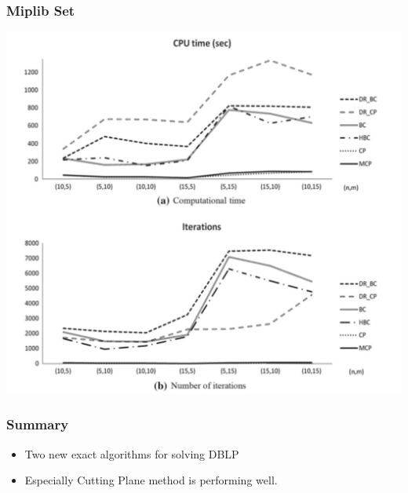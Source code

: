 \documentclass[11pt]{beamer}
\begin{document}
\begin{frame}
	\frametitle{Miplib Set}
\centering
\includegraphics[height=0.8\textheight]{run-times.pdf}
\end{frame}

\begin{frame}
	\frametitle{Summary}
	\begin{itemize}
		\item Two new exact algorithms for solving DBLP
		\item Especially Cutting Plane method is performing well.
	\end{itemize}
\end{frame}
\end{document}
